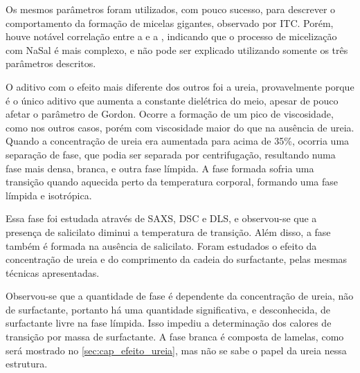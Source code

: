 		Os mesmos parâmetros foram utilizados, com pouco sucesso, para descrever o comportamento da formação de micelas gigantes, observado por ITC. Porém, houve notável correlação entre a \cmc{} e a \DHmic{}, indicando que o processo de micelização com NaSal é mais complexo, e não pode ser explicado utilizando somente os três parâmetros descritos.
		
		O aditivo com o efeito mais diferente dos outros foi a ureia, provavelmente porque é o único aditivo que aumenta a constante dielétrica do meio, apesar de pouco afetar o parâmetro de Gordon. Ocorre a formação de um pico de viscosidade, como nos outros casos, porém com viscosidade maior do que na ausência de ureia. Quando a concentração de ureia era aumentada para acima de 35\%, ocorria uma separação de fase, que podia ser separada por centrifugação, resultando numa fase mais densa, branca, e outra fase límpida. A fase formada sofria uma transição quando aquecida perto da temperatura corporal, formando uma fase límpida e isotrópica.
		
		Essa fase foi estudada através de SAXS, DSC e DLS, e observou-se que a presença de salicilato diminui a temperatura de transição. Além disso, a fase também é formada na ausência de salicilato. Foram estudados o efeito da concentração de ureia e do comprimento da cadeia do surfactante, pelas mesmas técnicas apresentadas.
		
		Observou-se que a quantidade de fase é dependente da concentração de ureia, não de surfactante, portanto há uma quantidade significativa, e desconhecida, de surfactante livre na fase límpida. Isso impediu a determinação dos calores de transição por massa de surfactante. A fase branca é composta de lamelas, como será mostrado no \autoref{sec:cap_efeito_ureia}, mas não se sabe o papel da ureia nessa estrutura.
		
\FloatBarrier
